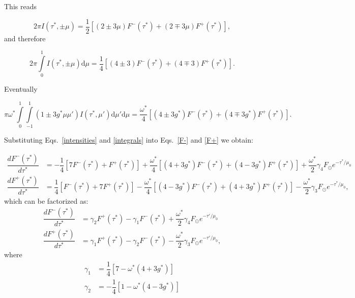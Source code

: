 \documentclass[a4paper,11pt]{article}
\begin{document}
\noindent This reads

\begin{equation}
2\pi I(\tau^*,\pm\mu) = \dfrac{1}{2}\left[(2\pm 3\mu)F^-(\tau^*)+(2\mp 3\mu)F^+(\tau^*)\right],
\label{intensities}
\end{equation}
and therefore

\begin{equation}
2\pi \displaystyle\int\limits_0^1 I(\tau^*,\pm\mu)\mathrm{d}\mu = \dfrac{1}{4}\left[(4\pm 3)F^-(\tau^*)+(4\mp 3)F^+(\tau^*)\right].
\label{integrals}
\end{equation}

\noindent Eventually

\begin{equation}
\pi \omega^*\displaystyle\int\limits_0^1 \displaystyle\int\limits_{-1}^1 (1\pm3g^*\mu\mu')I(\tau^*,\mu')\mathrm{d}\mu'\mathrm{d}\mu = \dfrac{\omega^*}{4}\left[(4\pm 3 g^*)F^-(\tau^*)+(4\mp 3 g^*)F^+(\tau^*)\right].
\label{integrals}
\end{equation}

Substituting Eqs.~\ref{intensities} and \ref{integrals} into Eqs.~\ref{F-} and \ref{F+} we obtain:

\begin{align}
\dfrac{dF^-(\tau^*)}{d\tau^*} & =-\dfrac{1}{4}\left[7F^-(\tau^*)+F^+(\tau^*)\right] + \dfrac{\omega^*}{4}\left[(4 + 3 g^*)F^-(\tau^*)+(4 - 3 g^*)F^+(\tau^*)\right] + \dfrac{\omega^*}{2} \gamma_4 F_\odot e^{-\tau^*/\mu_0}
\label{2S-} \\
\dfrac{dF^+(\tau^*)}{d\tau^*} & =\dfrac{1}{4}\left[F^-(\tau^*)+7F^+(\tau^*)\right] - \dfrac{\omega^*}{4}\left[(4 - 3 g^*)F^-(\tau^*)+(4 + 3 g^*)F^+(\tau^*)\right] - \dfrac{\omega^*}{2} \gamma_3 F_\odot e^{-\tau^*/\mu_0},
\label{2S+}
\end{align} 
which can be factorized as:
\begin{subequations}
\begin{align}
\dfrac{dF^-(\tau^*)}{d\tau^*} & = \gamma_2F^+(\tau^*)- \gamma_1 F^-(\tau^*) + \dfrac{\omega^*}{2} \gamma_4 F_\odot e^{-\tau'/\mu_0}
\label{F-_de} \\
\dfrac{dF^+(\tau^*)}{d\tau^*} & = \gamma_1F^+(\tau^*)- \gamma_2 F^-(\tau^*) - \dfrac{\omega^*}{2} \gamma_3 F_\odot e^{-\tau'/\mu_0},
\label{F+_de}
\end{align} 
\end{subequations}
where
\begin{align}
\gamma_1 & = \dfrac{1}{4}\left[7-\omega^*(4+3g^*)\right]\\
\gamma_2 & = -\dfrac{1}{4}\left[1-\omega^*(4-3g^*)\right]
\end{align}
\end{document}
